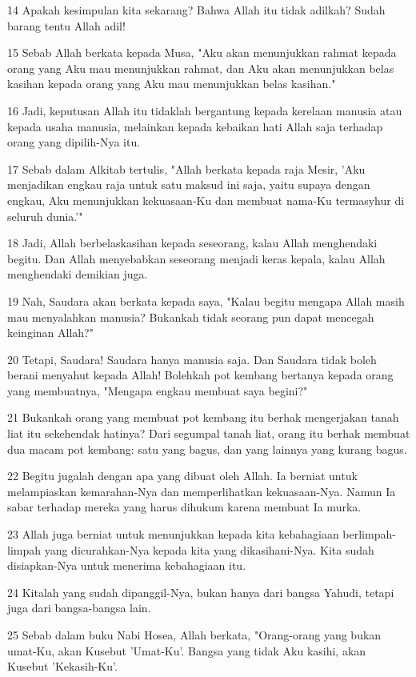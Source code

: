 \par 14 Apakah kesimpulan kita sekarang? Bahwa Allah itu tidak adilkah? Sudah barang tentu Allah adil!
\par 15 Sebab Allah berkata kepada Musa, "Aku akan menunjukkan rahmat kepada orang yang Aku mau menunjukkan rahmat, dan Aku akan menunjukkan belas kasihan kepada orang yang Aku mau menunjukkan belas kasihan."
\par 16 Jadi, keputusan Allah itu tidaklah bergantung kepada kerelaan manusia atau kepada usaha manusia, melainkan kepada kebaikan hati Allah saja terhadap orang yang dipilih-Nya itu.
\par 17 Sebab dalam Alkitab tertulis, "Allah berkata kepada raja Mesir, 'Aku menjadikan engkau raja untuk satu maksud ini saja, yaitu supaya dengan engkau, Aku menunjukkan kekuasaan-Ku dan membuat nama-Ku termasyhur di seluruh dunia.'"
\par 18 Jadi, Allah berbelaskasihan kepada seseorang, kalau Allah menghendaki begitu. Dan Allah menyebabkan seseorang menjadi keras kepala, kalau Allah menghendaki demikian juga.
\par 19 Nah, Saudara akan berkata kepada saya, "Kalau begitu mengapa Allah masih mau menyalahkan manusia? Bukankah tidak seorang pun dapat mencegah keinginan Allah?"
\par 20 Tetapi, Saudara! Saudara hanya manusia saja. Dan Saudara tidak boleh berani menyahut kepada Allah! Bolehkah pot kembang bertanya kepada orang yang membuatnya, "Mengapa engkau membuat saya begini?"
\par 21 Bukankah orang yang membuat pot kembang itu berhak mengerjakan tanah liat itu sekehendak hatinya? Dari segumpal tanah liat, orang itu berhak membuat dua macam pot kembang: satu yang bagus, dan yang lainnya yang kurang bagus.
\par 22 Begitu jugalah dengan apa yang dibuat oleh Allah. Ia berniat untuk melampiaskan kemarahan-Nya dan memperlihatkan kekuasaan-Nya. Namun Ia sabar terhadap mereka yang harus dihukum karena membuat Ia murka.
\par 23 Allah juga berniat untuk menunjukkan kepada kita kebahagiaan berlimpah-limpah yang dicurahkan-Nya kepada kita yang dikasihani-Nya. Kita sudah disiapkan-Nya untuk menerima kebahagiaan itu.
\par 24 Kitalah yang sudah dipanggil-Nya, bukan hanya dari bangsa Yahudi, tetapi juga dari bangsa-bangsa lain.
\par 25 Sebab dalam buku Nabi Hosea, Allah berkata, "Orang-orang yang bukan umat-Ku, akan Kusebut 'Umat-Ku'. Bangsa yang tidak Aku kasihi, akan Kusebut 'Kekasih-Ku'.

